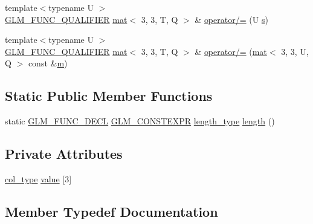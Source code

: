 \begin{DoxyCompactItemize}
\item 
{\footnotesize template$<$typename U $>$ }\\\hyperlink{setup_8hpp_a33fdea6f91c5f834105f7415e2a64407}{G\+L\+M\+\_\+\+F\+U\+N\+C\+\_\+\+Q\+U\+A\+L\+I\+F\+I\+ER} \hyperlink{structglm_1_1mat}{mat}$<$ 3, 3, T, Q $>$ \& \hyperlink{structglm_1_1mat_3_013_00_013_00_01_t_00_01_q_01_4_a01c97ce833185af46bbdb1ab5f4cb9a9}{operator/=} (U \hyperlink{_s_d_l__opengl_8h_a4af680a6c683f88ed67b76f207f2e6e4}{s})
\item 
{\footnotesize template$<$typename U $>$ }\\\hyperlink{setup_8hpp_a33fdea6f91c5f834105f7415e2a64407}{G\+L\+M\+\_\+\+F\+U\+N\+C\+\_\+\+Q\+U\+A\+L\+I\+F\+I\+ER} \hyperlink{structglm_1_1mat}{mat}$<$ 3, 3, T, Q $>$ \& \hyperlink{structglm_1_1mat_3_013_00_013_00_01_t_00_01_q_01_4_a9fea79c2d1b00d77863a64dad3ddb1af}{operator/=} (\hyperlink{structglm_1_1mat}{mat}$<$ 3, 3, U, Q $>$ const \&\hyperlink{_s_d_l__opengl__glext_8h_af593500c283bf1a787a6f947f503a5c2}{m})
\end{DoxyCompactItemize}
\subsection*{Static Public Member Functions}
\begin{DoxyCompactItemize}
\item 
static \hyperlink{setup_8hpp_ab2d052de21a70539923e9bcbf6e83a51}{G\+L\+M\+\_\+\+F\+U\+N\+C\+\_\+\+D\+E\+CL} \hyperlink{setup_8hpp_a08b807947b47031d3a511f03f89645ad}{G\+L\+M\+\_\+\+C\+O\+N\+S\+T\+E\+X\+PR} \hyperlink{structglm_1_1mat_3_013_00_013_00_01_t_00_01_q_01_4_ae1b8524f20936516a48384a2841b5b9d}{length\+\_\+type} \hyperlink{structglm_1_1mat_3_013_00_013_00_01_t_00_01_q_01_4_aa0e0966b5046ab9a88536683a901c589}{length} ()
\end{DoxyCompactItemize}
\subsection*{Private Attributes}
\begin{DoxyCompactItemize}
\item 
\hyperlink{structglm_1_1mat_3_013_00_013_00_01_t_00_01_q_01_4_a4d84bef3685131dbb0ac43cac0a3b147}{col\+\_\+type} \hyperlink{structglm_1_1mat_3_013_00_013_00_01_t_00_01_q_01_4_a505193d8cb434f9d92dafb3108e39452}{value} \mbox{[}3\mbox{]}
\end{DoxyCompactItemize}


\subsection{Member Typedef Documentation}
\mbox{\label{structglm_1_1mat_3_013_00_013_00_01_t_00_01_q_01_4_a4d84bef3685131dbb0ac43cac0a3b147}} 

